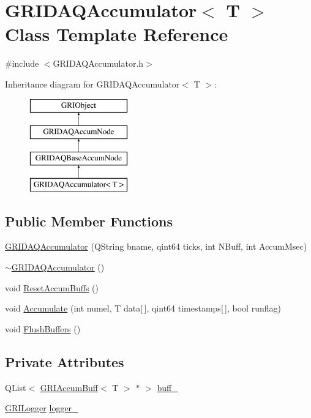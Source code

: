 \hypertarget{classGRIDAQAccumulator}{\section{\-G\-R\-I\-D\-A\-Q\-Accumulator$<$ \-T $>$ \-Class \-Template \-Reference}
\label{classGRIDAQAccumulator}
}


{\ttfamily \#include $<$\-G\-R\-I\-D\-A\-Q\-Accumulator.\-h$>$}

\-Inheritance diagram for \-G\-R\-I\-D\-A\-Q\-Accumulator$<$ \-T $>$\-:\begin{figure}[H]
\begin{center}
\leavevmode
\includegraphics[height=4.000000cm]{classGRIDAQAccumulator}
\end{center}
\end{figure}
\subsection*{\-Public \-Member \-Functions}
\begin{DoxyCompactItemize}
\item 
\hyperlink{classGRIDAQAccumulator_a6165ed9e7418dc3a136df4798a8cbf19}{\-G\-R\-I\-D\-A\-Q\-Accumulator} (\-Q\-String bname, qint64 ticks, int \-N\-Buff, int \-Accum\-Msec)
\item 
\hyperlink{classGRIDAQAccumulator_a8ebafd25c4e7bbad50fbb3b54133cb41}{$\sim$\-G\-R\-I\-D\-A\-Q\-Accumulator} ()
\item 
void \hyperlink{classGRIDAQAccumulator_adba80ef3e7238cc667818c210b38cb92}{\-Reset\-Accum\-Buffs} ()
\item 
void \hyperlink{classGRIDAQAccumulator_a9633bfc986cbaa511ba95b8a807f1571}{\-Accumulate} (int numel, \-T data\mbox{[}$\,$\mbox{]}, qint64 timestamps\mbox{[}$\,$\mbox{]}, bool runflag)
\item 
void \hyperlink{classGRIDAQAccumulator_a1dd946b038f31e333d56c689142a0181}{\-Flush\-Buffers} ()
\end{DoxyCompactItemize}
\subsection*{\-Private \-Attributes}
\begin{DoxyCompactItemize}
\item 
\-Q\-List$<$ \hyperlink{classGRIAccumBuff}{\-G\-R\-I\-Accum\-Buff}$<$ \-T $>$ $\ast$ $>$ \hyperlink{classGRIDAQAccumulator_a64939a45fcae8c062a1de6083a25423d}{buff\-\_\-}
\item 
\hyperlink{classGRILogger}{\-G\-R\-I\-Logger} \hyperlink{classGRIDAQAccumulator_a6ccd2aa334b6ddf7a301d664329febcf}{logger\-\_\-}
\end{DoxyCompactItemize}

